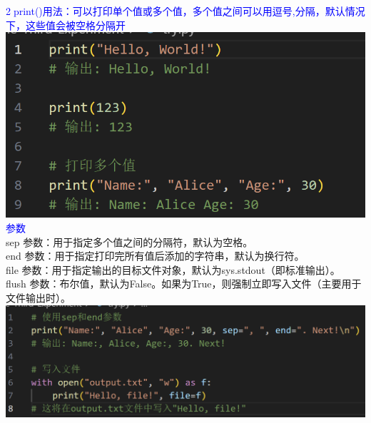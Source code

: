 \documentclass[12pt,a4paper,UTF8]{article}
\begin{document}
\begin{enumerate}
        \textcolor{blue}{\textcircled{2}print()用法：可以打印单个值或多个值，多个值之间可以用逗号,分隔，默认情况下，这些值会被空格分隔开}\\
        \includegraphics[scale=0.4]{pictures/9.png}\\
        \textcolor{blue}{参数}\\
        sep 参数：用于指定多个值之间的分隔符，默认为空格。\\
        end 参数：用于指定打印完所有值后添加的字符串，默认为换行符。\\
        file 参数：用于指定输出的目标文件对象，默认为sys.stdout（即标准输出）。\\
        flush 参数：布尔值，默认为False。如果为True，则强制立即写入文件（主要用于文件输出时）。\\
        \includegraphics[scale=0.3]{pictures/10.png}
    \end{enumerate}
\end{document}
